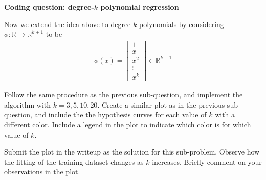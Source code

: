 \item {} {\bf Coding question: degree-$k$ polynomial regression}

Now we extend the idea above to degree-$k$ polynomials by considering $\phi:\mathbb{R}\rightarrow \mathbb{R}^{k+1}$ to be 
		\begin{align}
	\phi(x) = \left[\begin{array}{c} 1\\ x \\ x^2\\ \vdots \\x^k \end{array}\right]\in \mathbb{R}^{k+1} \label{eqn:feature-k}
	\end{align}

Follow the same procedure as the previous sub-question, and implement the algorithm with $k=3,5,10,20$. Create a similar plot as in the previous sub-question, and include the the hypothesis curves for each value of $k$ with a different color. Include a legend in the plot to indicate which color is for which value of $k$.


Submit the plot in the writeup as the solution for this sub-problem. Observe how the fitting of the training dataset changes as $k$ increases. Briefly comment on your observations in the plot.


